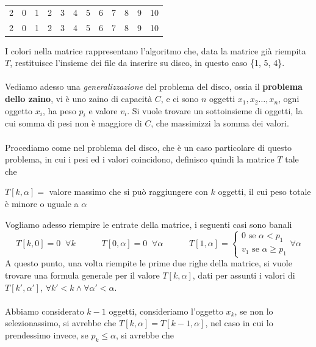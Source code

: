 \documentclass[12pt, letterpaper]{article}
\newcommand{\acc}{\\\hphantom{}\\}
\begin{document}
\begin{center}
\begin{tabular}{c|ccccccccccc}
        2                         & 0 & 1                         & 2                         & 3                         & 4                         & 5                         & 6                                                & 7                         & 8                         & 9                         & \cellcolor[HTML]{9AFF99}10                       \\
        2                         & 0 & 1                         & 2                         & 3                         & 4                         & 5                         & 6                                                & 7                         & 8                         & 9                         & \cellcolor[HTML]{FFCCC9}10
    \end{tabular}
\end{center}
I colori nella matrice rappresentano l'algoritmo che,
data la matrice già riempita $T$, restituisce l'insieme dei file da inserire su disco, in questo caso \{1, 5, 4\}. \acc
Vediamo adesso una \textit{generalizzazione} del problema del disco, ossia il \textbf{problema dello zaino}, vi è uno zaino
di capacità $C$, e ci sono $n$ oggetti $x_1,x_2\dots,x_n$, ogni oggetto $x_i$, ha peso $p_i$ e valore $v_i$. Si vuole trovare un
sottoinsieme di oggetti, la cui somma di pesi non è maggiore di $C$, che massimizzi la somma dei valori.\acc
Procediamo come nel problema del disco, che è un caso particolare di questo problema, in cui i pesi ed i valori coincidono,
definisco quindi la matrice $T$ tale che\begin{center}
    $T[k,\alpha]=$ valore massimo che si può raggiungere con $k$ oggetti, il cui peso totale è minore o uguale a $\alpha$
\end{center}
Vogliamo adesso riempire le entrate della matrice, i seguenti casi sono banali
$$T[k,0]=0\;\;\forall k\;\;\;\;\;\;\;\;\;\;\;T[0,\alpha]=0\;\;\forall \alpha\;\;\;\;\;\;\;\;\;\;\;T[1,\alpha]=\begin{cases}
        0\text{ se }\alpha<p_1 \\
        v_1\text{ se }\alpha\ge p_1
    \end{cases}\forall \alpha$$
A questo punto, una volta riempite le prime due righe della matrice, si vuole trovare una formula generale per
il valore $T[k,\alpha]$, dati
per assunti i valori di $T[k',\alpha']$, $\forall k'<k\land \forall \alpha'<\alpha$. \acc
Abbiamo considerato $k-1$ oggetti, consideriamo l'oggetto $x_k$, se non lo selezionassimo, si avrebbe che
$T[k,\alpha]=T[k-1,\alpha]$, nel caso in cui lo prendessimo invece, se $p_k\le \alpha$, si avrebbe che
\end{document}
